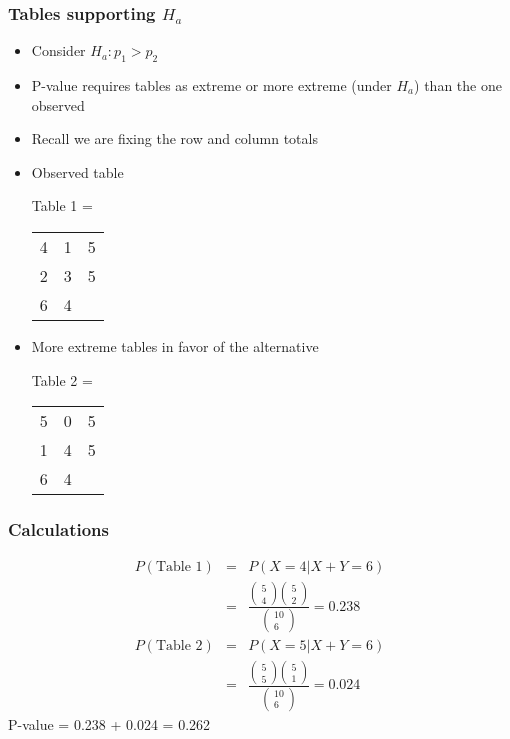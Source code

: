 \documentclass[aspectratio=169]{beamer}
\begin{document}
\begin{frame}\frametitle{Tables supporting $H_a$}
\begin{itemize}
\item Consider $H_a : p_1 > p_2$
\item P-value requires tables as extreme or more extreme
  (under $H_a$) than the one observed
\item Recall we are fixing the row and column totals
\item Observed table
\begin{center}
Table 1 = 
  \begin{tabular}{cc|l} 
4     & 1        & 5 \\  
2     & 3        & 5 \\ \hline
6     & 4        &
  \end{tabular}
\end{center}
\item More extreme tables in favor of the alternative
\begin{center}
Table 2 = 
  \begin{tabular}{cc|l}
5     & 0       & 5 \\ 
1     & 4       & 5 \\\hline 
6     & 4       &
  \end{tabular} 
\end{center}
\end{itemize}
\end{frame}


\begin{frame}\frametitle{Calculations}
\begin{eqnarray*}
P(\mbox{Table 1}) & = & P(X = 4 | X + Y = 6) \\ & = &
\frac{\left(\begin{array}{c} 5 \\ 4 \end{array}\right) 
\left(\begin{array}{c} 5 \\ 2 \end{array} \right)}
{\left( \begin{array}{c} 10 \\ 6 \end{array} \right)} = 0.238
\end{eqnarray*}
\begin{eqnarray*}
P(\mbox{Table 2}) & = & P(X = 5 | X + Y = 6) \\ & = &
\frac{\left(\begin{array}{c} 5 \\ 5 \end{array}\right) 
\left(\begin{array}{c} 5 \\ 1 \end{array} \right)}
{\left( \begin{array}{c} 10 \\ 6 \end{array} \right)} = 0.024
\end{eqnarray*}
P-value = 0.238 + 0.024 = 0.262
\end{frame}
\end{document}
